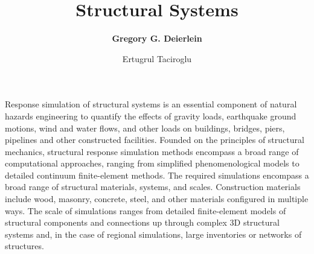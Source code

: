 %
%
%


%
%
%
%
%
%
%
%

\title{Structural Systems}
\author{
    \textbf{Gregory G. Deierlein} 
    \and Ertugrul Taciroglu}
\tocauthor{}
%
%
\maketitle

Response simulation of structural systems is an essential component of natural hazards engineering to quantify the effects of gravity loads, earthquake ground motions, wind and water flows, and other loads on buildings, bridges, piers, pipelines and other constructed facilities. Founded on the principles of structural mechanics, structural response simulation methods encompass a broad range of computational approaches, ranging from simplified phenomenological models to detailed continuum finite-element methods. The required simulations encompass a broad range of structural materials, systems, and scales. Construction materials include wood, masonry, concrete, steel, and other materials configured in multiple ways. The scale of simulations ranges from detailed finite-element models of structural components and connections up through complex 3D structural systems and, in the case of regional simulations, large inventories or networks of structures.

